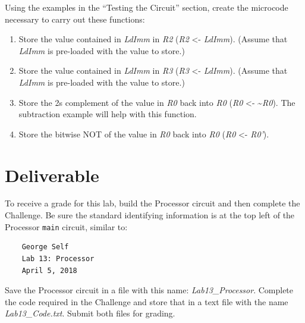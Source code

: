 Using the examples in the ``Testing the Circuit'' section, create the microcode necessary to carry out these functions:

\begin{enumerate}
	\item Store the value contained in \textit{LdImm} in \textit{R2} (\textit{R2} <- \textit{LdImm}). (Assume that \textit{LdImm} is pre-loaded with the value to store.)
	
	\item Store the value contained in \textit{LdImm} in \textit{R3} (\textit{R3} <- \textit{LdImm}). (Assume that \textit{LdImm} is pre-loaded with the value to store.)
	
	\item Store the 2s complement of the value in \textit{R0} back into \textit{R0} (\textit{R0} <- \textasciitilde \textit{R0}). The subtraction example will help with this function.
	
	\item Store the bitwise NOT of the value in \textit{R0} back into \textit{R0} (\textit{R0} <- \textit{R0'}).
\end{enumerate}

\section{Deliverable}

To receive a grade for this lab, build the Processor circuit and then complete the Challenge. Be sure the standard identifying information is at the top left of the Processor \lstinline{main} circuit, similar to: 

\bigskip
\begin{minipage}{\linewidth}
	\begin{verbatim}
	George Self
	Lab 13: Processor
	April 5, 2018
	\end{verbatim}
\end{minipage}
\bigskip

Save the Processor circuit in a file with this name: \textit{Lab13\_Processor}. Complete the code required in the Challenge and store that in a text file with the name \textit{Lab13\_Code.txt}. Submit both files for grading.

